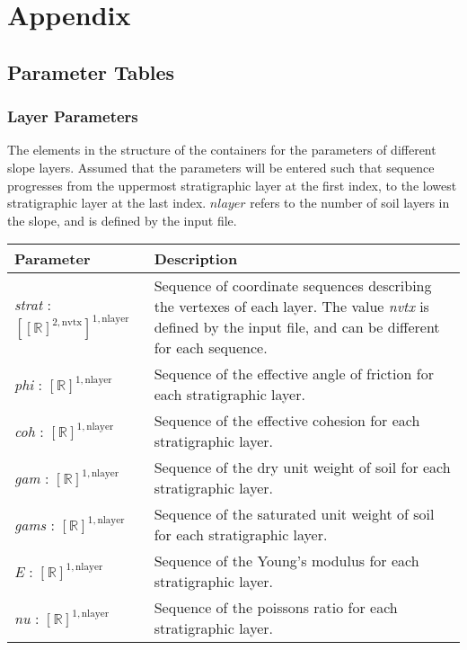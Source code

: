 \documentclass[12pt, titlepage]{article}
\begin{document}
\section{Appendix}

\subsection{Parameter Tables} \label{sec:ParamTables}

\subsubsection{Layer Parameters} \label{Tbl:LayerParam}
\noindent
The elements in the structure of the containers for the parameters of
different slope layers. Assumed that the parameters will be entered
such that sequence progresses from the uppermost stratigraphic layer
at the first index, to the lowest stratigraphic layer at the last
index. $nlayer$ refers to the number of soil layers in the slope, and
is defined by the input file.

\begin{center}
\begin{longtable}{ p{}
    p{}}\hline

  \textbf{Parameter} & \textbf{Description}\\ \hline

  \textit{strat} : $[[\mathbb{R}]^{2,\text{nvtx}}]^{1,\text{nlayer}}$
  & Sequence of coordinate sequences describing the vertexes of each
  layer. The value \textit{nvtx} is defined by the input file, and can
  be different for each sequence.\\

  \textit{phi} : $[\mathbb{R}]^{1,\text{nlayer}}$ & Sequence of the
  effective angle of friction for each stratigraphic layer.\\

  \textit{coh} : $[\mathbb{R}]^{1,\text{nlayer}}$ & Sequence of the
  effective cohesion for each stratigraphic layer.\\

  \textit{gam} : $[\mathbb{R}]^{1,\text{nlayer}}$ & Sequence of the dry
  unit weight of soil for each stratigraphic layer.\\

  \textit{gams} : $[\mathbb{R}]^{1,\text{nlayer}}$ & Sequence of the
  saturated unit weight of soil for each stratigraphic layer.\\

  \textit{E} : $[\mathbb{R}]^{1,\text{nlayer}}$ & Sequence of the
  Young's modulus for each stratigraphic layer.\\

  \textit{nu} : $[\mathbb{R}]^{1,\text{nlayer}}$ & Sequence of the
  poissons ratio for each stratigraphic layer. \\ \hline
\end{longtable}
\end{center}
\end{document}
